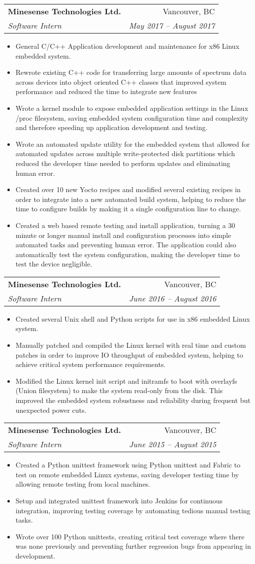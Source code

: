 \documentclass[letterpaper,11pt]{article}
\makeatletter
\newcommand{\resumeItem}[2]{
  \item\small{
    \textbf{#1}{#2 \vspace{-2pt}}
  }
}
\newcommand{\resumeSubheading}[4]{
  \vspace{-1pt}\item
    \begin{tabular*}{0.97\textwidth}[t]{l@{\extracolsep{\fill}}r}
      \textbf{#1} & #2 \\
      \textit{\small#3} & \textit{\small #4} \\
    \end{tabular*}\vspace{-5pt}
}
\newcommand{\resumeItemListStart}{\begin{itemize}}
\newcommand{\resumeItemListEnd}{\end{itemize}\vspace{-5pt}}
\makeatother
\begin{document}
    \resumeSubheading
      {Minesense Technologies Ltd.}{Vancouver, BC} 
      {Software Intern}{May 2017 -- August 2017}
      \resumeItemListStart
        \resumeItem{} {General C/C++ Application development and maintenance for x86 Linux embedded system.}
        \resumeItem{} {Rewrote existing C++ code for transferring large amounts of spectrum data across devices into object oriented C++ classes that improved system performance and reduced the time to integrate new features}
        \resumeItem{} {Wrote a kernel module to expose embedded application settings in the Linux /proc filesystem, saving embedded system configuration time and complexity and therefore speeding up application development and testing.}
        \resumeItem{} {Wrote an automated update utility for the embedded system that allowed for automated updates across multiple write-protected disk partitions which reduced the developer time needed to perform updates and eliminating human error.}
        \resumeItem{} {Created over 10 new Yocto recipes and modified several existing recipes in order to integrate into a new automated build system, helping to reduce the time to configure builds by making it a single configuration line to change.}
        \resumeItem{} {Created a web based remote testing and install application, turning a 30 minute or longer manual install and configuration processes into simple automated tasks and preventing human error. The application could also automatically test the system configuration, making the developer time to test the device negligible.}
      \resumeItemListEnd

    \resumeSubheading
      {Minesense Technologies Ltd.}{Vancouver, BC}
      {Software Intern}{June 2016 -- August 2016}
      \resumeItemListStart
        \resumeItem{} {Created several Unix shell and Python scripts for use in x86 embedded Linux system.}
        \resumeItem{} {Manually patched and compiled the Linux kernel with real time and custom patches in order to improve IO throughput of embedded system, helping to achieve critical system performance requirements.}
        \resumeItem{} {Modified the Linux kernel init script and initramfs to boot with overlayfs (Union filesystem) to make the system read-only from the disk. This improved the embedded system robustness and reliability during frequent but unexpected power cuts.}
      \resumeItemListEnd

    \resumeSubheading
      {Minesense Technologies Ltd.}{Vancouver, BC}
      {Software Intern}{June 2015 -- August 2015}
      \resumeItemListStart
        \resumeItem{} {Created a Python unittest framework using Python unittest and Fabric to test on remote embedded Linux systems, saving developer testing time by allowing remote testing from local machines.}
        \resumeItem{} {Setup and integrated unittest framework into Jenkins for continuous integration, improving testing coverage by automating tedious manual testing tasks.}
        \resumeItem{} {Wrote over 100 Python unittests, creating critical test coverage where there was none previously and preventing further regression bugs from appearing in development.}
      \resumeItemListEnd
\end{document}
